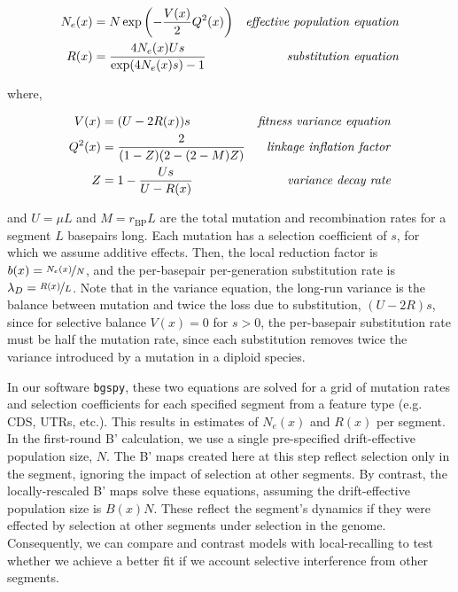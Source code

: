 \documentclass[11pt]{article}
\begin{document}
\begin{align}
  \label{eq:}
  {N}_{e}(x) &= N \exp \left( -\frac{V(x)}{2} Q^2(x) \right) & \text{\emph{effective population equation}} \\
  {R}(x) &= \frac{4N_e(x)U s}{\exp(4 N_e(x) s)-1}  & \text{\emph{substitution equation}} 
\end{align}

where,

\begin{align}
  V(x) &= (U  - 2 {R}(x)) s & \text{\emph{fitness variance equation}} \\
  Q^2(x) &= \frac{2}{(1-Z)(2-(2-M)Z)} & \text{\emph{linkage inflation factor}} \\
  Z &= 1 - \frac{Us}{U-{R(x)}} & \text{\emph{}} \text{\emph{variance decay rate}}
\end{align}

and $U = \mu L$ and $M = r_\text{BP} L$ are the total mutation and
recombination rates for a segment $L$ basepairs long. Each mutation has a
selection coefficient of $s$, for which we assume additive effects. Then, the
local reduction factor is $b(x) = \nicefrac{N_e(x)}{N}$, and the per-basepair
per-generation substitution rate is $\lambda_D = \nicefrac{R(x)}{L}$. Note that
in the variance equation, the long-run variance is the balance between mutation
and twice the loss due to substitution, $(U-2R)s$, since for selective balance
$V(x) = 0$ for $s>0$, the per-basepair substitution rate must be half the mutation rate,
since each substitution removes twice the variance introduced by a mutation in
a diploid species.

In our software \texttt{bgspy}, these two equations are solved for a grid of
mutation rates and selection coefficients for each specified segment from a
feature type (e.g. CDS, UTRs, etc.). This results in estimates of $N_e(x)$ and
$R(x)$ per segment. In the first-round B' calculation, we use a single
pre-specified drift-effective population size, $N$. The B' maps created here at
this step reflect selection only in the segment, ignoring the impact of
selection at other segments. By contrast, the locally-rescaled B' maps solve
these equations, assuming the drift-effective population size is $B(x)N$. These
reflect the segment's dynamics if they were effected by selection at other
segments under selection in the genome. Consequently, we can compare and
contrast models with local-recalling to test whether we achieve a better fit if
we account selective interference from other segments.
\end{document}
